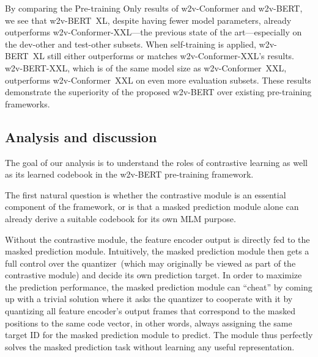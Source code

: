 \documentclass{article}
\begin{document}
By comparing the Pre-training Only results of w2v-Conformer and w2v-BERT, we see that w2v-BERT~XL, despite having fewer model parameters, already outperforms w2v-Conformer-XXL---the previous state of the art---especially on the dev-other and test-other subsets.
When self-training is applied, w2v-BERT~XL still either outperforms or matches w2v-Conformer-XXL's results.
w2v-BERT-XXL, which is of the same model size as w2v-Conformer~XXL, outperforms w2v-Conformer~XXL on even more evaluation subsets.
These results demonstrate the superiority of the proposed w2v-BERT over existing pre-training frameworks.


\subsection{Analysis and discussion}
\label{sec:analysis}
The goal of our analysis is to understand the roles of contrastive learning as well as its learned codebook
in the w2v-BERT pre-training framework.

The first natural question is whether the contrastive module is an essential component of the framework, or is that a masked prediction module alone can already derive a suitable codebook for its own MLM purpose.

Without the contrastive module, the feature encoder output is directly fed to the masked prediction module.
Intuitively, the masked prediction module then gets a full control over the quantizer~(which may originally be viewed as part of the contrastive module) and decide its own prediction target.
In order to maximize the prediction performance, the masked prediction module can ``cheat'' by coming up with a trivial solution where it asks the quantizer to cooperate with it by quantizing all feature encoder's output frames that correspond to the masked positions to the same code vector, in other words, always assigning the same target ID for the masked prediction module to predict.
The module thus perfectly solves the masked prediction task without learning any useful representation.
\end{document}
